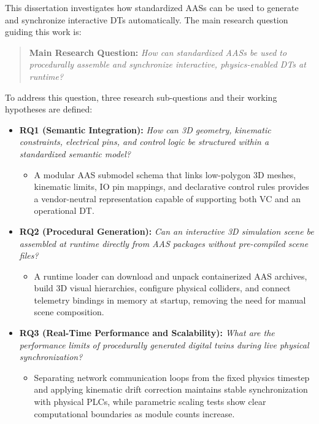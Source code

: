 This dissertation investigates how standardized \glspl{AAS} can be used to generate and synchronize interactive \glspl{DT} automatically. The main research question guiding this work is:

\begin{quote}
    \textbf{Main Research Question:} \textit{How can standardized \glspl{AAS} be used to procedurally assemble and synchronize interactive, physics-enabled \glspl{DT} at runtime?}
\end{quote}

To address this question, three research sub-questions and their working hypotheses are defined:

\begin{itemize}
    \item \textbf{RQ1 (Semantic Integration):} \textit{How can 3D geometry, kinematic constraints, electrical pins, and control logic be structured within a standardized semantic model?}
    \begin{itemize}
        \item[\textbf{H1:}] A modular \gls{AAS} submodel schema that links low-polygon 3D meshes, kinematic limits, \gls{IO} pin mappings, and declarative control rules provides a vendor-neutral representation capable of supporting both \gls{VC} and an operational \gls{DT}.
    \end{itemize}

    \item \textbf{RQ2 (Procedural Generation):} \textit{Can an interactive 3D simulation scene be assembled at runtime directly from \gls{AAS} packages without pre-compiled scene files?}
    \begin{itemize}
        \item[\textbf{H2:}] A runtime loader can download and unpack containerized \gls{AAS} archives, build 3D visual hierarchies, configure physical colliders, and connect telemetry bindings in memory at startup, removing the need for manual scene composition.
    \end{itemize}

    \item \textbf{RQ3 (Real-Time Performance and Scalability):} \textit{What are the performance limits of procedurally generated digital twins during live physical synchronization?}
    \begin{itemize}
        \item[\textbf{H3:}] Separating network communication loops from the fixed physics timestep and applying kinematic drift correction maintains stable synchronization with physical \glspl{PLC}, while parametric scaling tests show clear computational boundaries as module counts increase.
    \end{itemize}
\end{itemize}

